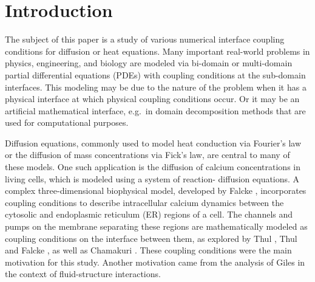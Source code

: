 %
%
\section{Introduction}
\label{sec:int}
%
%

The subject of this paper is a study of various numerical interface coupling conditions for 
diffusion or heat equations.     
Many important real-world problems in physics, engineering, and biology are modeled via bi-domain or multi-domain
partial differential equations (PDEs) with coupling conditions at the sub-domain interfaces. 
This modeling may be due to the nature of the problem when it has a
physical interface at which physical coupling conditions occur. Or it may be an artificial mathematical interface, 
e.g.\ in domain decomposition methods that are used for computational purposes. 


Diffusion equations, commonly used to model heat conduction via Fourier's law or the diffusion of mass concentrations via Fick's law, are central to 
many of these models. One such application is the diffusion of calcium concentrations in living cells, which is modeled using a system of reaction-
diffusion equations. A complex three-dimensional biophysical model, developed by Falcke \cite{l8}, incorporates coupling conditions to describe 
intracellular calcium dynamics between the cytosolic and endoplasmic reticulum (ER) regions of a cell. The channels and pumps on the membrane 
separating these regions are mathematically modeled as coupling conditions on the interface between them, 
as explored by Thul \cite{l10}, Thul and Falcke \cite{l11}, as well as 
Chamakuri \cite{l9}. These coupling conditions were the main motivation for this study.
Another motivation came from the analysis of Giles \cite{GIL} in the context of fluid-structure interactions.


